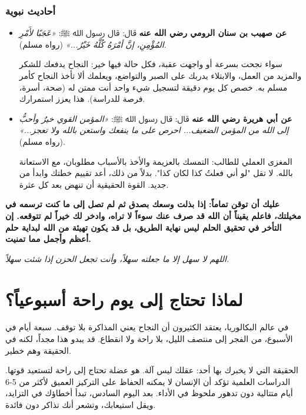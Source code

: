 \documentclass[12pt,a4paper]{book}
\newcommand{\quoteAr}[1]{%
	\begin{myquote}
		\itshape #1
	\end{myquote}
}
\newcommand{\importantAr}[1]{%
	\begin{important}
		\bfseries #1
	\end{important}
}
\begin{document}
	\subsubsection*{أحاديث نبوية}
	
	\begin{itemize}
		\item \textbf{عن صهيب بن سنان الرومي رضي الله عنه} قال: قال رسول الله ﷺ: \emph{«عَجَبًا لأَمْرِ المُؤْمِنِ، إنَّ أمْرَهُ كُلَّهُ خَيْرٌ...»} (رواه مسلم).
		
		سواء نجحت بسرعة أو واجهت عقبة، فكل حالة فيها خير: النجاح يدفعك للشكر والمزيد من العمل، والابتلاء يدربك على الصبر والتواضع، ويعلمك ألا تأخذ النجاح كأمر مسلم به. خصص كل يوم دقيقة لتسجيل شيء واحد أنت ممتن له (صحة، أسرة، فرصة للدراسة). هذا يعزز استمرارك.
		
		\item \textbf{عن أبي هريرة رضي الله عنه} قال: قال رسول الله ﷺ: \emph{«المؤمن القوي خيرٌ وأحبُّ إلى الله من المؤمن الضعيف... احرص على ما ينفعك واستعن بالله ولا تعجز...»} (رواه مسلم).
		
		المغزى العملي للطالب: التمسك بالعزيمة والأخذ بالأسباب مطلوبان، مع الاستعانة بالله. لا تقل "لو أني فعلتُ كذا لكان كذا". بدلاً من ذلك، أعد تقييم خطتك وابدأ من جديد. القوة الحقيقية أن تنهض بعد كل عثرة.
	\end{itemize}
	
	\importantAr{عليك أن توقن تماماً: إذا بذلت وسعك بصدق ثم لم تصل إلى ما كنت ترسمه في مخيلتك، فاعلم يقيناً أن الله قد صرف عنك سوءاً لا تراه، وادخر لك خيراً لم تتوقعه. إن التأخر في تحقيق الحلم ليس نهاية الطريق، بل قد يكون تهيئة من الله لبداية حلم أعظم وأجمل مما تمنيت.}
	
	\quoteAr{اللهم لا سهل إلا ما جعلته سهلاً، وأنت تجعل الحزن إذا شئت سهلاً.}
	
	
	\section{لماذا تحتاج إلى يوم راحة أسبوعياً؟}
	\label{sec:weekly-rest}
	
	في عالم البكالوريا، يعتقد الكثيرون أن النجاح يعني المذاكرة بلا توقف. سبعة أيام في الأسبوع، من الفجر إلى منتصف الليل، بلا راحة ولا انقطاع. قد يبدو هذا مجداً، لكنه في الحقيقة وهم خطير.
	
	الحقيقة التي لا يخبرك بها أحد: عقلك ليس آلة. هو عضلة تحتاج إلى راحة لتستعيد قوتها. الدراسات العلمية تؤكد أن الإنسان لا يمكنه الحفاظ على التركيز العميق لأكثر من 5-6 أيام متتالية دون تدهور ملحوظ في الأداء. بعد اليوم السادس، تبدأ أخطاؤك في التزايد، ويقل استيعابك، وتشعر أنك تذاكر دون فائدة.
	
\end{document}
